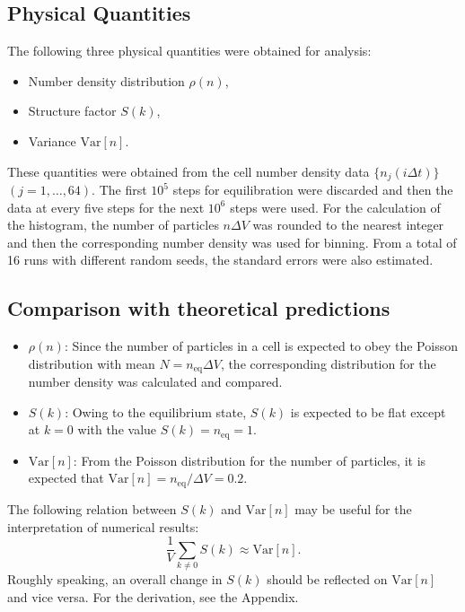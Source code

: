\documentclass{article}
\begin{document}
\subsection{Physical Quantities}

The following three physical quantities were obtained for analysis:
\begin{itemize}
\item Number density distribution $\rho(n)$,
\item Structure factor $S(k)$,
\item Variance $\mathrm{Var}[n]$.
\end{itemize}

These quantities were obtained from the cell number density data $\{n_j(i\Delta t)\}$ $(j=1,\dots,64)$.
The first $10^5$ steps for equilibration were discarded and then the data at every five steps for the next $10^6$ steps were used.
For the calculation of the histogram, the number of particles $n\Delta V$ was rounded to the nearest integer and then the corresponding number density was used for binning.
From a total of 16 runs with different random seeds, the standard errors were also estimated.   

\subsection{Comparison with theoretical predictions}

\begin{itemize}
\item $\rho(n)$: Since the number of particles in a cell is expected to obey the Poisson distribution with mean $N=n_\mathrm{eq}\Delta V$, the corresponding distribution for the number density was calculated and compared.
\item $S(k)$: Owing to the equilibrium state, $S(k)$ is expected to be flat except at $k=0$ with the value $S(k)=n_\mathrm{eq}=1$.
\item $\mathrm{Var}[n]$: From the Poisson distribution for the number of particles, it is expected that $\mathrm{Var}[n]=n_\mathrm{eq}/\Delta V=0.2$.
\end{itemize}

\noindent The following relation between $S(k)$ and $\mathrm{Var}[n]$ may be useful for the interpretation of numerical results: 
\begin{equation}
\label{sumSknonzero}
\frac{1}{V}\sum_{k\ne0}S(k)\approx \mathrm{Var}[n].
\end{equation}
Roughly speaking, an overall change in $S(k)$ should be reflected on $\mathrm{Var}[n]$ and vice versa.
For the derivation, see the Appendix.
\end{document}
